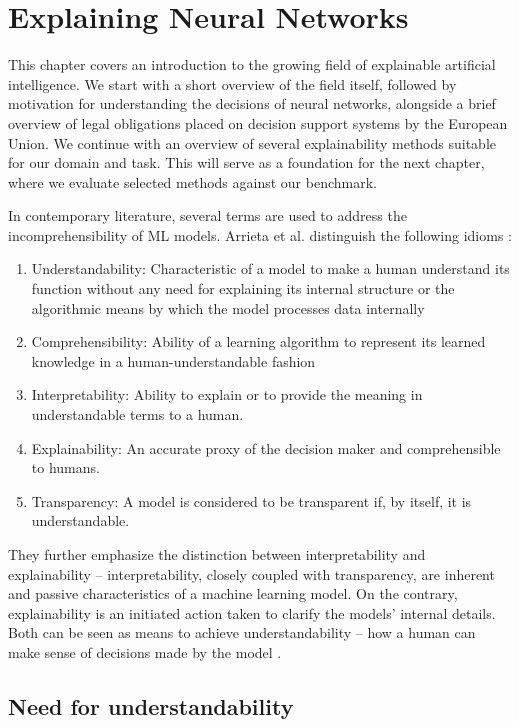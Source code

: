 \chapter{Explaining Neural Networks}

This chapter covers an introduction to the growing field of explainable artificial intelligence.
We start with a short overview of the field itself, followed by motivation for understanding the decisions of neural networks, alongside a brief overview of legal obligations placed on decision support systems by the European Union.
We continue with an overview of several explainability methods suitable for our domain and task.
This will serve as a foundation for the next chapter, where we evaluate selected methods against our benchmark.

In contemporary literature, several terms are used to address the incomprehensibility of ML models. Arrieta et al. distinguish the following idioms \cite{arrieta-taxonomy}:

\begin{enumerate}
    \item Understandability: Characteristic of a model to make a human understand its function without any need for explaining its internal structure or the algorithmic means by which the model processes data internally
    \item Comprehensibility: Ability of a learning algorithm to represent its learned knowledge in a human-understandable fashion 
    \item Interpretability: Ability to explain or to provide the meaning in understandable terms to a human.
    \item Explainability: An accurate proxy of the decision maker and comprehensible to humans.
    \item Transparency: A model is considered to be transparent if, by itself, it is understandable.
\end{enumerate}

They further emphasize the distinction between interpretability and explainability -- interpretability, closely coupled with transparency, are inherent and passive characteristics of a machine learning model.
On the contrary, explainability is an initiated action taken to clarify the models' internal details.
Both can be seen as means to achieve understandability -- how a human can make sense of decisions made by the model \cite{arrieta-taxonomy}.


\section{Need for understandability}\label{sec:need-for-xai}

